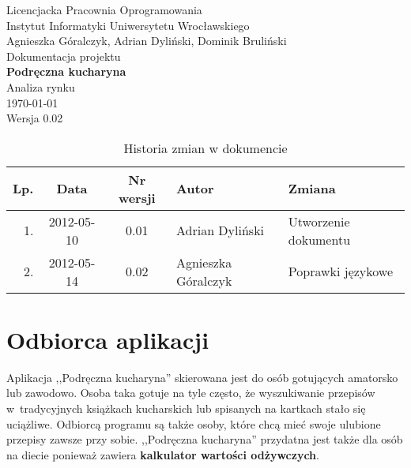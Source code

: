 \documentclass[12pt,leqno, twoside]{mwart}
\begin{document}
\thispagestyle{empty}
\begin{center}
Licencjacka Pracownia Oprogramowania \\ Instytut
Informatyki Uniwersytetu Wrocławskiego \\
\vspace{4cm}
\Large Agnieszka Góralczyk, Adrian Dyliński, Dominik Bruliński \\
\vspace{0.5cm}
\huge Dokumentacja projektu\\ \textbf{Podręczna kucharyna}\\ \Large Analiza rynku\\
\vspace{1cm}
\normalsize \today \\
\vspace{2cm}
\normalsize Wersja 0.02
\end{center}

\newpage


\begin{table}
	\centering
	\caption{Historia zmian w dokumencie}
		\begin{tabular}{|r|c|c|l|l|}
		\hline
		Lp. & Data       & Nr wersji & Autor               & Zmiana \\ \hline
		1.   & 2012-05-10 & 0.01 & Adrian Dyliński & Utworzenie dokumentu \\ \hline
		2.  & 2012-05-14 & 0.02 & Agnieszka Góralczyk & Poprawki językowe \\ \hline
		\end{tabular}
\end{table}

\newpage

\tableofcontents
\newpage
\section{Odbiorca aplikacji}
Aplikacja ,,Podręczna kucharyna'' skierowana jest do osób gotujących amatorsko lub zawodowo. Osoba taka gotuje na tyle często, że wyszukiwanie przepisów w~tradycyjnych książkach kucharskich lub spisanych na kartkach stało się uciążliwe. Odbiorcą programu są także osoby, które chcą mieć swoje ulubione przepisy zawsze przy sobie. ,,Podręczna kucharyna'' przydatna jest także dla osób na diecie ponieważ zawiera \textbf{kalkulator wartości odżywczych}.
\end{document}
